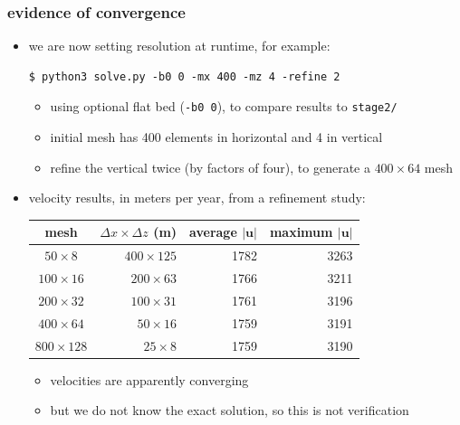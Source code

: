 \documentclass[10pt,
               hyperref={colorlinks,citecolor=DeepPink4,linkcolor=black,urlcolor=blue},
               svgnames]{beamer}
\newcommand{\bu}{\mathbf{u}}
\begin{document}
\begin{frame}[fragile]
\frametitle{evidence of convergence}

\begin{itemize}
\item we are now setting resolution at runtime, for example:
\begin{Verbatim}
$ python3 solve.py -b0 0 -mx 400 -mz 4 -refine 2
\end{Verbatim}
    \begin{itemize}
    \item[$\circ$] using optional flat bed (\texttt{-b0 0}), to compare results to \texttt{stage2/}
    \item[$\circ$] initial mesh has 400 elements in horizontal and 4 in vertical
    \item[$\circ$] refine the vertical twice (by factors of four), to generate a $400\times 64$ mesh
    \end{itemize}
\item velocity results, in meters per year, from a refinement study:

\medskip
\begin{center}
\small
\begin{tabular}{c|rrr}
mesh           &   $\Delta x\times \Delta z$ (m) & average $|\bu|$ & maximum $|\bu|$ \\ \hline
$50\times 8$   &   $400 \times 125$ &        1782 &     3263     \\
$100\times 16$ &   $200 \times 63$  &        1766 &     3211     \\
$200\times 32$ &   $100 \times 31$  &        1761 &     3196     \\
$400\times 64$ &   $50  \times 16$  &        1759 &     3191     \\
$800\times 128$&   $25  \times 8$   &        1759 &     3190    
\end{tabular}
\normalsize
\end{center}

    \begin{itemize}
    \item[$\circ$] velocities are apparently converging
    \item[$\circ$] but we do not know the exact solution, so this is not verification
    \end{itemize}
\end{itemize}
\end{frame}
\end{document}
